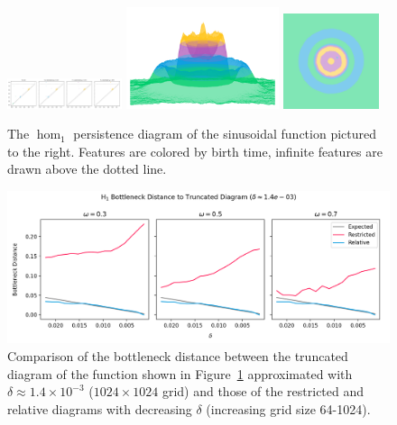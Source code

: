 
\begin{figure}[htbp]\label{fig:ripple1}
  \centering
  \includegraphics[trim=0 0 790 0, clip, width=0.3\textwidth]{scripts/figures/matching2/full-dgm.png}
  \includegraphics[trim=-350 -800 -700 -300, clip, width=0.4\textwidth]{scripts/figures/matching2/full-surf_side-lowres.png}
  \includegraphics[trim=0 -800 0 0, width=0.25\textwidth]{scripts/figures/matching2/full-surf_top-lowres.png}
  \caption{The $\hom_1$ persistence diagram of the sinusoidal function pictured to the right.
          Features are colored by birth time, infinite features are drawn above the dotted line.}
\end{figure}

\begin{figure}[htbp]
  \centering
  \includegraphics[width=\textwidth]{scripts/figures/matching2/bottleneck_delta.png}
  \caption{Comparison of the bottleneck distance between the truncated diagram of the function shown in Figure~\ref{fig:ripple1} approximated with $\delta\approx 1.4\times10^{-3}$ ($1024\times 1024$ grid) and those of the restricted and relative diagrams with decreasing $\delta$ (increasing grid size 64-1024).}
\end{figure}

